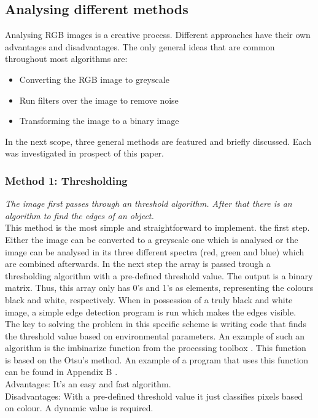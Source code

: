 \documentclass{article}
\begin{document}
\subsection{Analysing different methods}
Analysing RGB images is a creative process. Different approaches have their own advantages and disadvantages. The only general ideas that are common throughout most algorithms are:
\begin{itemize}
\item Converting the RGB image to greyscale
\item Run filters over the image to remove noise
\item Transforming the image to a binary image
\end{itemize}
In the next scope, three general methods are featured and briefly discussed. Each was investigated in prospect of this paper.
\subsubsection{Method 1: Thresholding}

\textit{The image first passes through an threshold algorithm. After that there is an algorithm to find the edges of an object.}\\ 
This method is the most simple and straightforward to implement. the first step. Either the image can be converted to a greyscale one which is analysed or the image can be analysed in its three different spectra (red, green and blue) which are combined afterwards. In the next step the array is passed trough a thresholding algorithm with a pre-defined threshold value. The output is a binary matrix. Thus, this array only has 0's and 1's as elements, representing the colours black and white, respectively. When in possession of a truly black and white image, a simple edge detection program is run which makes the edges visible.\\
The key to solving the problem in this specific scheme is writing code that finds the threshold value based on environmental parameters. An example of such an algorithm is the imbinarize function from the processing toolbox \cite{Mathworks}. This function is based on the Otsu's method. An example of a program that uses this function can be found in Appendix B \cite{threshold}.
\\Advantages: It’s an easy and fast algorithm.
\\Disadvantages: With a pre-defined threshold value it just classifies pixels based on colour. A dynamic value is required.
\end{document}
